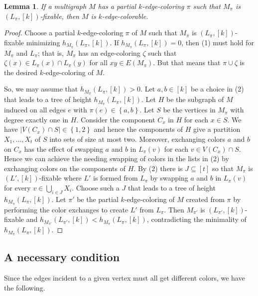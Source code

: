 \documentclass[12pt]{article}
\theoremstyle{plain}
\newtheorem{lem}[thm]{Lemma}
\theoremstyle{definition}
\theoremstyle{remark}
\newcommand{\set}[1]{\left\{ #1 \right\}}
\newcommand{\card}[1]{\left|#1\right|}
\newcommand{\irange}[1]{\left[#1\right]}
\newcommand{\parens}[1]{\left( #1 \right)}
\begin{document}
\begin{lem}\label{FixableCompletesColoring}
If a multigraph $M$ has a partial $k$-edge-coloring $\pi$ such that $M_\pi$ is $(L_\pi, \irange{k})$-fixable, then $M$ is $k$-edge-colorable.
\end{lem}
\begin{proof}
Choose a partial $k$-edge-coloring $\pi$ of $M$ such that $M_\pi$ is $(L_\pi, \irange{k})$-fixable minimizing $h_{M_\pi}\parens{L_\pi, \irange{k}}$. If $h_{M_\pi}\parens{L_\pi, \irange{k}} = 0$, then (1) must hold for $M_\pi$ and $L_\pi$; that is, $M_\pi$ has an edge-coloring $\zeta$ such that $\zeta(x) \in L_\pi(x) \cap L_\pi(y)$ for all $xy \in E(M_\pi)$.  But that means that $\pi \cup \zeta$ is the desired $k$-edge-coloring of $M$.  

So, we may assume that $h_{M_\pi}\parens{L_\pi, \irange{k}} > 0$.  Let $a,b \in \irange{k}$ be a choice in (2) that leads to a tree of height $h_{M_\pi}\parens{L_\pi, \irange{k}}$.  Let $H$ be the subgraph of $M$ induced on all edges $e$ with $\pi(e) \in \set{a,b}$.  Let $S$ be the vertices in $M_\pi$ with degree exactly one in $H$.  Consider the component $C_x$ in $H$ for each $x \in S$.  We have $\card{V(C_x) \cap S} \in \set{1,2}$ and hence the components of $H$ give a partition $X_1, \ldots, X_t$ of $S$ into sets of size at most two.  Moreover, exchanging colors $a$ and $b$ on $C_x$ has the effect of swapping $a$ and $b$ in $L_\pi(v)$ for each $v \in V(C_x) \cap S$.  Hence we can achieve the needing swapping of colors in the lists in (2) by exchanging colors on the components of $H$.  By (2) there is $J \subseteq \irange{t}$ so that $M_\pi$ is $(L', \irange{k})$-fixable where $L'$ is formed from $L_\pi$ by swapping $a$ and $b$ in $L_\pi(v)$ for every $v \in \bigcup_{i \in J} X_i$.  Choose such a $J$ that leads to a tree of height $h_{M_\pi}\parens{L_\pi, \irange{k}}$.  Let $\pi'$ be the partial $k$-edge-coloring of $M$ created from $\pi$ by performing the color exchanges to create $L'$ from $L_\pi$.  Then $M_{\pi'}$ is $(L_{\pi'}, \irange{k})$-fixable and $h_{M_{\pi'}}\parens{L_{\pi'}, \irange{k}} < h_{M_\pi}\parens{L_\pi, \irange{k}}$, contradicting the minimality of $h_{M_\pi}\parens{L_\pi, \irange{k}}$.
\end{proof}

\subsection{A necessary condition}
Since the edges incident to a given vertex must all get different colors, we have the following.
\end{document}
